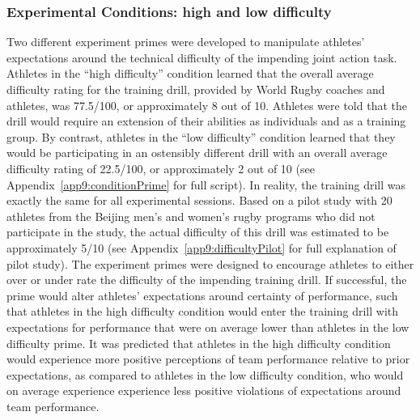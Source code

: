 \begin{CJK}{UTF8}{gbsn}


\subsubsection{Experimental Conditions: high and low difficulty\label{sect:expPrimes}}
Two different experiment primes were developed   to manipulate athletes' expectations around the technical difficulty of the impending joint action task.  Athletes in the ``high difficulty'' condition learned that the overall average difficulty rating for the training drill, provided by World Rugby coaches and athletes, was 77.5/100, or approximately 8 out of 10.  Athletes were told that the drill would require an extension of their abilities as individuals and as a training group.  By contrast, athletes in the ``low difficulty'' condition learned that they would be participating in an ostensibly different drill with an overall average difficulty rating of 22.5/100, or approximately 2 out of 10 (see Appendix~\ref{app9:conditionPrime} for full script).  In reality, the training drill was exactly the same for all experimental sessions.  Based on a pilot study with 20 athletes from the Beijing men's and women's rugby programs who did not participate in the study, the actual difficulty of this drill was estimated to be approximately 5/10 (see Appendix~\ref{app9:difficultyPilot} for full explanation of pilot study).  The experiment primes were designed to encourage athletes to either over or under rate the difficulty of the impending training drill. If successful, the prime would alter athletes' expectations around certainty of performance, such that athletes in the high difficulty condition would enter the training drill with expectations for performance that were on average lower than athletes in the low difficulty prime. It was predicted that athletes in the high difficulty condition would experience more positive perceptions of team performance relative to prior expectations, as compared to athletes in the low difficulty condition, who would on average experience experience less positive violations of expectations around team performance.



\end{CJK}
